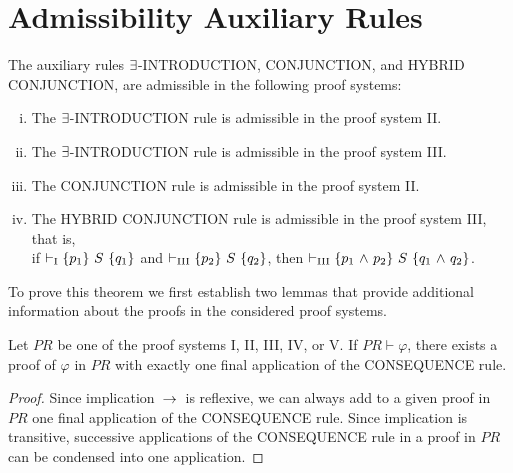 \documentclass[runningheads]{llncs}       %
\begin{document}
\section{Admissibility Auxiliary Rules}\label{sec:proof}
\begin{theorem} \label{thm:1}
The auxiliary rules $\mbox{$\exists$}$-{\rm INTRODUCTION}, {\rm CONJUNCTION},
and {\rm HYBRID CONJUNCTION}, are admissible in the following proof systems:

 \begin{enumerate} [(i)] 
    
   \item The $\mbox{$\exists$}$-{\rm INTRODUCTION} rule is admissible in the proof system {\rm II}. 
        
   \item The $\mbox{$\exists$}$-{\rm INTRODUCTION} rule is admissible in the proof system {\rm III}.
  
   \item The {\rm CONJUNCTION} rule is admissible in the proof system {\rm II}.

   \item The {\rm HYBRID CONJUNCTION} rule is admissible in the proof system {\rm III},
         that is, \\
         if $\vdash_{\rm{I}} \mbox{$\{{p_1}\}\ {S}\ \{{q_1}\}$}$ and $\vdash_{\rm{III}} \mbox{$\{{p_2}\}\ {S}\ \{{q_2}\}$}$, then
         $\vdash_{\rm{III}} \mbox{$\{{p_1 \mbox{$\ \wedge\ $} p_2}\}\ {S}\ \{{q_1 \mbox{$\ \wedge\ $} q_2}\}$}$.

 \end{enumerate}

\end{theorem}


To prove this theorem we first establish two lemmas that provide additional
information about the proofs in the considered proof systems.

\begin{lemma} \label{lemma:1}
Let $\mathit{PR}$ be one of the proof systems I, II, III, IV, or V.
If $\mathit{PR} \vdash \varphi$, there exists a proof of $\varphi$ in $\mathit{PR}$ 
with exactly one final application of the CONSEQUENCE rule.
\end{lemma}

\begin{proof}
Since implication $\mbox{$\:\rightarrow\:$}$ is reflexive, we can always add to a given proof in $\mathit{PR}$
one final application of the CONSEQUENCE rule.
Since implication is transitive, successive applications of the CONSEQUENCE rule in a proof in $\mathit{PR}$
can be condensed into one application.
\HB
\end{proof} 
\end{document}
